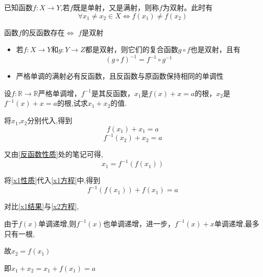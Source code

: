 \begin{definition}[双射]
    已知函数$f:X\rightarrow Y$,若$f$既是单射，又是满射，则称$f$为双射。此时有
    \begin{equation*}
        \forall x_1 \ne x_2\in X \Longleftrightarrow f(x_1) \ne f(x_2)
    \end{equation*}
\end{definition}

\begin{theorem}[反函数存在的充分必要条件]
    函数$f$的反函数存在$\Longleftrightarrow$ $f$是双射
\end{theorem}

\begin{note}
    \begin{itemize}
        \item 若$f:X \rightarrow Y$和$g:Y\rightarrow Z$都是双射，则它们的复合函数$g\circ f$也是双射，且有
              \begin{equation*}
                  (g\circ f)^{-1}=f^{-1}\circ g^{-1}
              \end{equation*}

        \item 严格单调的满射必有反函数，且反函数与原函数保持相同的单调性
    \end{itemize}
\end{note}

\newpage

\begin{example}
    设$f:\mathbb{R} \rightarrow \mathbb{R}$严格单调增，$f^{-1}$是其反函数，$x_1$是$f(x)+x=a$的根，$x_2$是$f^{-1}(x)+x=a$的根,试求$x_1+x_2$的值.
\end{example}

\begin{solution}

    将$x_1$,$x_2$分别代入,得到
    \begin{equation}
        f(x_1)+x_1=a \label{x1方程}
    \end{equation}
    \begin{equation}
        f^{-1}(x_2)+x_2=a \label{x2方程}
    \end{equation}

    又由\ref{反函数性质}处的笔记可得,
    \begin{equation}
        x_1=f^{-1}(f(x_1)) \label{x1性质}
    \end{equation}

    将\ref{x1性质}代入\ref{x1方程}中,得到
    \begin{equation}
        f^{-1}(f(x_1))+f(x_1)=a \label{x1结果}
    \end{equation}

    对比\ref{x1结果}与\ref{x2方程},

    由于$f(x)$单调递增,则$f^{-1}(x)$也单调递增，进一步，$f^{-1}(x)+x$单调递增,最多只有一根,

    故$x_2=f(x_1)$

    即$x_1+x_2=x_1+f(x_1)=a$
\end{solution}

